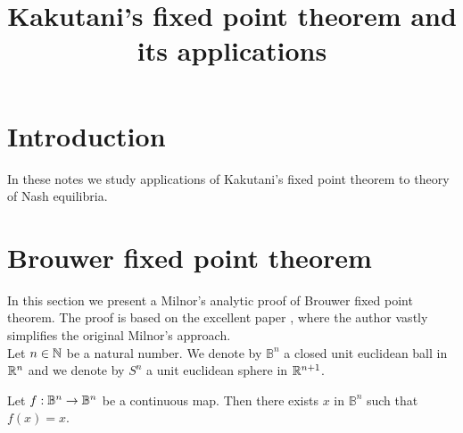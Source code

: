 \documentclass[10pt]{amsart}
\begin{document}
\title{Kakutani's fixed point theorem and its applications}
\date{}
\maketitle

\section{Introduction}
In these notes we study applications of Kakutani's fixed point theorem to theory of Nash equilibria.

\section{Brouwer fixed point theorem}
\noindent
In this section we present a Milnor's analytic proof of Brouwer fixed point theorem. The proof is based on the excellent paper \cite{BrouwerRogers}, where the author vastly simplifies the original Milnor's approach.\\
Let $n\in {\mathbb N}$ be a natural number. We denote by $\mathbb{B}^n$ a closed unit euclidean ball in ${\mathbb R}^n$ and we denote by $S^n$ a unit euclidean sphere in ${\mathbb R}^{n+1}$.

\begin{theorem}
Let $f:\mathbb{B}^n\rightarrow \mathbb{B}^n$ be a continuous map. Then there exists $x$ in $\mathbb{B}^n$ such that $f(x) = x$.
\end{theorem}
\end{document}

